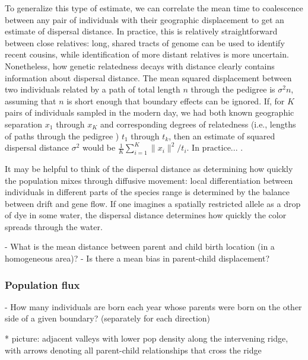 \documentclass{ar-1col}
\begin{document}
To generalize this type of estimate,
we can correlate the mean time to coalescence between any pair of individuals
with their geographic displacement
to get an estimate of dispersal distance.
In practice,
this is relatively straightforward between close relatives:
long, shared tracts of genome can be used to identify recent cousins,
while identification of more distant relatives is more uncertain.
Nonetheless, how genetic relatedness decays with distance 
clearly contains information about dispersal distance.
The mean squared displacement between two individuals 
related by a path of total length $n$ through the pedigree 
is $\sigma^2 n$, 
assuming that $n$ is short enough that boundary effects can be ignored.
If, for $K$ pairs of individuals sampled in the modern day, 
we had both known geographic separation $x_1$ through $x_K$
and corresponding degrees of relatedness (i.e., lengths of paths through the pedigree ) 
$t_1$ through $t_k$,
then an estimate of squared dispersal distance $\sigma^2$ would be 
$\frac{1}{K}\sum_{i=1}^K \|x_i\|^2 / t_i$.
In practice... \cite{Malecot, Barton, Harald}.


It may be helpful to think of the dispersal distance 
as determining how quickly the population mixes through diffusive movement:
local differentiation between individuals in different parts of the species range 
is determined by the balance between drift and gene flow.
If one imagines a spatially restricted allele 
as a drop of dye in some water, 
the dispersal distance determines how quickly the 
color spreads through the water. 




        - What is the mean distance between parent and child birth location (in a homogeneous area)?
        - Is there a mean bias in parent-child displacement?

\subsubsection{Population flux}

        - How many individuals are born each year whose parents were born on the other side of a given boundary?
            (separately for each direction)

            * picture: adjacent valleys with lower pop density along the intervening ridge,
                with arrows denoting all parent-child relationships that cross the ridge
\end{document}
